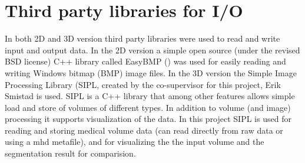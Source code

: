 \section{Third party libraries for I/O}
In both 2D and 3D version third party libraries were used to read and write input and output data. In the 2D version a simple open source (under the revised BSD license) C++ library called EasyBMP (\cite{easyBMP}) was used for easily reading and writing Windows bitmap (BMP) image files. In the 3D version the Simple Image Processing Library (SIPL, \cite{sipl} created by the co-supervisor for this project, Erik Smistad is used. SIPL is a C++ library that among other features allows simple load and store of volumes of different types. In addition to volume (and image) processing it supports visualization of the data. In this project SIPL is used for reading and storing medical volume data (can read directly from raw data or using a mhd metafile), and for visualizing the the input volume and the segmentation result for comparision.